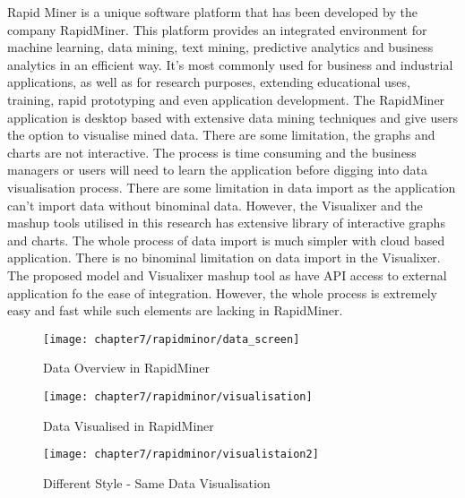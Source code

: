 Rapid Miner is a unique software platform that has been developed by the company RapidMiner. This platform provides an integrated environment for machine learning, data mining, text mining, predictive analytics and business analytics in an efficient way. It's most commonly used for business and industrial applications, as well as for research purposes, extending educational uses, training, rapid prototyping and even application development. The RapidMiner application is desktop based with extensive data mining techniques and give users the option to visualise mined data. There are some limitation, the graphs and charts are not interactive. The process is time consuming and the business managers or users will need to learn the application before digging into data visualisation process. There are some limitation in data import as the application can't import data without binominal data. However, the Visualixer and the mashup tools utilised in this research has extensive library of interactive graphs and charts. The whole process of data import is much simpler with cloud based application. There is no binominal limitation on data import in the Visualixer. The proposed model and Visualixer mashup tool as have API access to external application fo the ease of integration. However, the whole process is extremely easy and fast while such elements are lacking in RapidMiner. 

\begin{figure}[H]
\centering
\texttt{[image: chapter7/rapidminor/data\_screen]}
\caption{Data Overview in RapidMiner}
\end{figure}

\begin{figure}[H]
\centering
\texttt{[image: chapter7/rapidminor/visualisation]}
\caption{Data Visualised in RapidMiner}
\end{figure}

\begin{figure}[H]
\centering
\texttt{[image: chapter7/rapidminor/visualistaion2]}
\caption{Different Style - Same Data Visualisation}
\end{figure}

